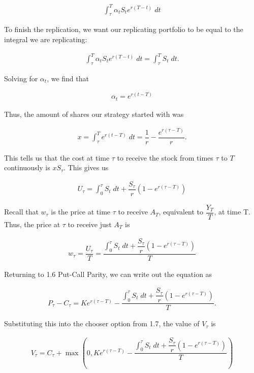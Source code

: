 \documentclass[reqno]{amsart}
\begin{document}
\begin{align}
     \int_\tau^T \alpha_t S_t e^{r(T-t)} \; dt
\end{align}

To finish the replication, we want our replicating portfolio to be equal to the integral we are replicating:

\begin{align}
     \int_\tau^T \alpha_t S_t e^{r(T-t)} \; dt = \int_\tau^T S_t \; dt.
\end{align}

Solving for $\alpha_t$, we find that

\begin{align}
     \alpha_t = e^{r(t-T)}
\end{align}

Thus, the amount of shares our strategy started with was

\begin{align}
     x = \int_\tau^T e^{r(t-T)} \; dt = \dfrac{1}{r} - \dfrac{e^{r(\tau - T)}}{r}.
\end{align}

This tells us that the cost at time $\tau$ to receive the stock from times $\tau$ to $T$ continuously is $x S_\tau$. This gives us 

\begin{align}
     U_\tau = \int_0^\tau S_t \; dt + \dfrac{S_\tau}{r}\left( 1 - e^{r(\tau - T)} \right)
\end{align}

Recall that $w_\tau$ is the price at time $\tau$ to receive $A_T$, equivalent to $\dfrac{Y_T}{T}$, at time T.
Thus, the price at $\tau$ to receive just $A_T$ is 

\begin{align}
     w_\tau = \dfrac{U_\tau}{T} = \dfrac{\int_0^\tau S_t \; dt + \dfrac{S_\tau}{r}\left( 1 - e^{r(\tau - T)} \right)}{T}
\end{align}

Returning to 1.6 Put-Call Parity, we can write out the equation as

\begin{align}
     P_\tau - C_\tau = Ke^{r(\tau - T)} - \dfrac{\int_0^\tau S_t \; dt + \dfrac{S_\tau}{r}\left( 1 - e^{r(\tau - T)} \right)}{T}.
\end{align}

Substituting this into the chooser option from 1.7, the value of $V_\tau$ is

\begin{align}
     V_\tau = C_\tau + \max(0, Ke^{r(\tau - T)} - \dfrac{\int_0^\tau S_t \; dt + \dfrac{S_\tau}{r}\left( 1 - e^{r(\tau - T)} \right)}{T})
\end{align}
\end{document}
